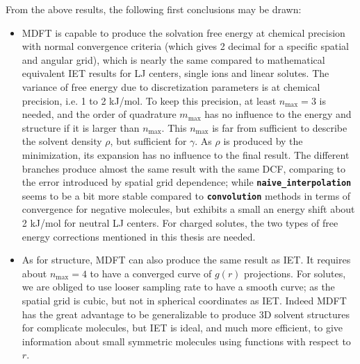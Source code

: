 From the above results, the following first conclusions may be drawn:
\begin{itemize}
\item \acs{MDFT} is capable to produce the solvation free energy at chemical
precision with normal convergence criteria (which gives 2 decimal
for a specific spatial and angular grid), which is nearly the same
compared to mathematical equivalent \acs{IET} results for LJ centers,
single ions and linear solutes. The variance of free energy due to
discretization parameters is at chemical precision, i.e. 1 to 2 kJ/mol.
To keep this precision, at least $n_{\max}=3$ is needed, and the
order of quadrature $m_{\max}$ has no influence to the energy and
structure if it is larger than $n_{\max}$. This $n_{\max}$ is far
from sufficient to describe the solvent density $\rho$, but sufficient
for $\gamma$. As $\rho$ is produced by the minimization, its expansion
has no influence to the final result. The different branches produce
almost the same result with the same \acs{DCF}, comparing to the
error introduced by spatial grid dependence; while \texttt{\textbf{naive\_interpolation}}
seems to be a bit more stable compared to \texttt{\textbf{convolution}}
methods in terms of convergence for negative molecules, but exhibits
a small an energy shift about 2 kJ/mol for neutral LJ centers. For
charged solutes, the two types of free energy corrections mentioned
in this thesis are needed.
\item As for structure, \acs{MDFT} can also produce the same result as
\acs{IET}. It requires about $n_{\max}=4$ to have a converged curve
of $g(r)$ projections. For solutes, we are obliged to use looser
sampling rate to have a smooth curve; as the spatial grid is cubic,
but not in spherical coordinates as \acs{IET}. Indeed \acs{MDFT}
has the great advantage to be generalizable to produce 3D solvent
structures for complicate molecules, but \acs{IET} is ideal, and
much more efficient, to give information about small symmetric molecules
using functions with respect to $r$.
\end{itemize}

